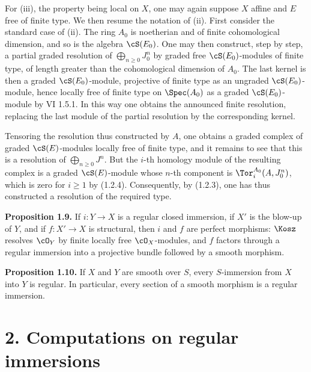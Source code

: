 For (iii), the property being local on \(X\), one may again suppose \(X\) affine and \(E\) free of finite type. We then resume the notation of (ii). First consider the standard case of (ii). The ring \(A_0\) is noetherian and of finite cohomological dimension, and so is the algebra \(\cS(E_0)\). One may then construct, step by step, a partial graded resolution of \(\bigoplus_{n\ge0}J_0^n\) by graded free \(\cS(E_0)\)-modules of finite type, of length greater than the cohomological dimension of \(A_0\). The last kernel is then a graded \(\cS(E_0)\)-module, projective of finite type as an ungraded \(\cS(E_0)\)-module, hence locally free of finite type on \(\Spec(A_0)\) as a graded \(\cS(E_0)\)-module by VI 1.5.1. In this way one obtains the announced finite resolution, replacing the last module of the partial resolution by the corresponding kernel.

Tensoring the resolution thus constructed by \(A\), one obtains a graded complex of graded \(\cS(E)\)-modules locally free of finite type, and it remains to see that this is a resolution of \(\bigoplus_{n\ge0}J^n\). But the \(i\)-th homology module of the resulting complex is a graded \(\cS(E)\)-module whose \(n\)-th component is \(\Tor_i^{A_0}(A,J_0^n)\), which is zero for \(i\ge1\) by (1.2.4). Consequently, by (1.2.3), one has thus constructed a resolution of the required type.

\textbf{Proposition 1.9.} If \(i:Y\to X\) is a regular closed immersion, if \(X'\) is the blow-up of \(Y\), and if \(f:X'\to X\) is structural, then \(i\) and \(f\) are perfect morphisms: \(\Kosz\) resolves \(\cO_Y\) by finite locally free \(\cO_X\)-modules, and \(f\) factors through a regular immersion into a projective bundle followed by a smooth morphism.

\textbf{Proposition 1.10.} If \(X\) and \(Y\) are smooth over \(S\), every \(S\)-immersion from \(X\) into \(Y\) is regular. In particular, every section of a smooth morphism is a regular immersion.

\section*{2. Computations on regular immersions}

